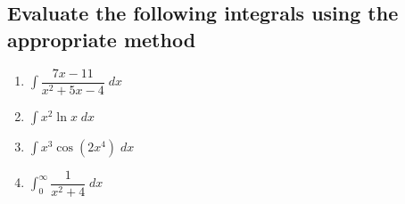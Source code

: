 \documentclass[
]{article}
\begin{document}
\hypertarget{evaluate-the-following-integrals-using-the-appropriate-method}{%
\subsection{Evaluate the following integrals using the appropriate
method}\label{evaluate-the-following-integrals-using-the-appropriate-method}}

\begin{enumerate}
	\setlength{\itemsep}{2in}
	\setcounter{enumi}{6}
\def\labelenumi{\arabic{enumi}.}
\item
  \(\displaystyle \int \dfrac{7x-11}{x^2+5x-4} \; dx\)
\item
  \(\displaystyle \int x^2 \ln x \; dx\)
\item
  \(\displaystyle \int x^3 \cos(2x^4) \; dx\)
\item
  \(\displaystyle \int_0^\infty \dfrac{1}{x^2+4} \; dx\)
\end{enumerate}
\end{document}
